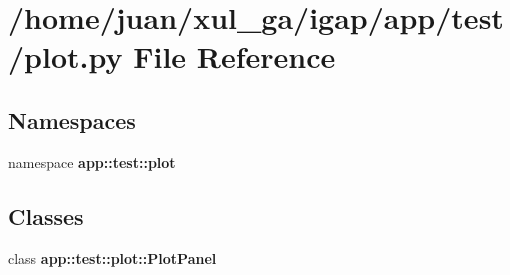 \section{/home/juan/xul\_\-ga/igap/app/test/plot.py File Reference}
\label{plot_8py}
\subsection*{Namespaces}
\begin{CompactItemize}
\item 
namespace {\bf app::test::plot}
\end{CompactItemize}
\subsection*{Classes}
\begin{CompactItemize}
\item 
class {\bf app::test::plot::PlotPanel}
\end{CompactItemize}
